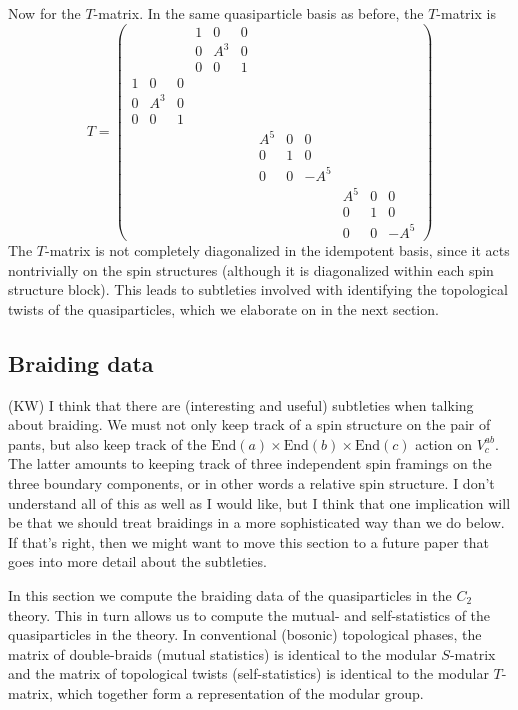 \documentclass[12pt,a4paper]{article}
\newcommand\be            {\begin{equation}}
\newcommand\ee            {\end{equation}}
\newcommand{\End}{\text{End}}
\newcommand{\kw}[1]{{\color{kwcolor}\footnotesize{(KW) #1}}}
\begin{document}
Now for the $T$-matrix. 
In the same quasiparticle basis as before, the $T$-matrix is
\be 
T = \begin{pmatrix}   			&&&				1&0&0&		&&&			&& \\ 
					        &&&				0&A^3&0&	&&&			&&\\
					        &&& 				0&0&1&		&&&			&&\\
						1&0&0&			&&&			&&&			&& \\
						0&A^3&0&		&&&			&&&			&&\\
						0&0&1&			&&&			&&&			&&\\
						&&&				&&&			A^{5}&0&0&	&&\\
						&&&				&&&			0&1&0&		&&\\
						&&&				&&&			0&0&-A^{5}&	&&\\
						&&&				&&&			&&&			A^{5}&0&0\\
						&&&				&&&			&&&			0&1&0 \\ 
						&&&				&&&			&&&			0&0&-A^{5} \end{pmatrix}\ee	
The $T$-matrix is not completely diagonalized in the idempotent basis, since it acts nontrivially on the spin structures (although it is diagonalized within each spin structure block). 
This leads to subtleties involved with identifying the topological twists of the quasiparticles, 
which we elaborate on in the next section. 




\subsection{Braiding data} \label{C2_braiding}

\kw{I think that there are (interesting and useful) subtleties when talking about braiding.
We must not only keep track of a spin structure on the pair of pants, but also keep track of 
the $\End(a)\times\End(b)\times\End(c)$ action on $V^{ab}_c$.
The latter amounts to keeping track of three independent spin framings on the three boundary
components, or in other words a relative spin structure.
I don't understand all of this as well as I would like, but I think that one
implication will be that we should treat braidings in a more sophisticated way than we do below.
If that's right, then we might want to move this section to a future paper that goes into more detail
about the subtleties.
}

In this section we compute the braiding data of the quasiparticles in the $C_2$ theory.
This in turn allows us to compute the mutual- and self-statistics of the quasiparticles in the theory.
In conventional (bosonic) topological phases, the matrix of double-braids (mutual statistics) 
is identical to the modular $S$-matrix and the matrix of topological twists (self-statistics) is identical to the 
modular $T$-matrix, which together form a representation of the modular group.  
\end{document}
